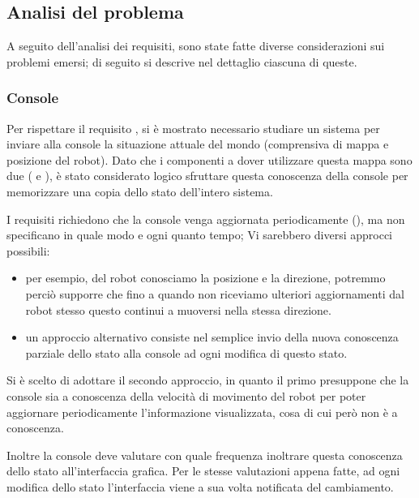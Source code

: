 \subsection{Analisi del problema}

A seguito dell'analisi dei requisiti, sono state fatte diverse considerazioni sui problemi emersi;
di seguito si descrive nel dettaglio ciascuna di queste.

\subsubsection{Console}

Per rispettare il requisito , si è mostrato necessario studiare un sistema per inviare alla console la situazione attuale del mondo (comprensiva di mappa e posizione del robot).
Dato che i componenti a dover utilizzare questa mappa sono due ( e ), è stato considerato logico sfruttare questa conoscenza della console per memorizzare una copia dello stato dell'intero sistema.

I requisiti richiedono che la console venga aggiornata periodicamente (), ma non specificano in quale modo e ogni quanto tempo;
Vi sarebbero diversi approcci possibili:

\begin{itemize}
  \item
    per esempio, del robot conosciamo la posizione e la direzione, potremmo perciò supporre che fino a quando non riceviamo ulteriori aggiornamenti dal robot stesso questo continui a muoversi nella stessa direzione.
  \item
    un approccio alternativo consiste nel semplice invio della nuova conoscenza parziale dello stato alla console ad ogni modifica di questo stato.
\end{itemize}

Si è scelto di adottare il secondo approccio, in quanto il primo presuppone che la console sia a conoscenza della velocità di movimento del robot per poter aggiornare periodicamente l'informazione visualizzata, cosa di cui però non è a conoscenza.

Inoltre la console deve valutare con quale frequenza inoltrare questa conoscenza dello stato all'interfaccia grafica.
Per le stesse valutazioni appena fatte, ad ogni modifica dello stato l'interfaccia viene a sua volta notificata del cambiamento.

